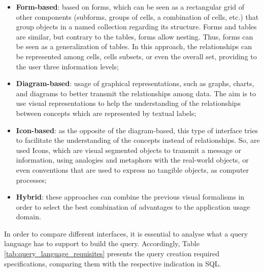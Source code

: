 \begin{itemize}
    \item \textbf{Form-based}: based on forms, which can be seen as a rectangular grid of other components (subforms, groups of cells, a combination of cells, etc.) that group objects in a named collection regarding its structure. Forms and tables are similar,  but contrary to the tables, forms allow nesting. Thus, forms can be seen as a generalization of tables. In this approach, the relationships can be represented among cells, cells subsets, or even the overall set, providing to the user three information levels; %
    \item \textbf{Diagram-based}: usage of graphical representations, such as graphs, charts, and diagrams to better transmit the relationships among data. The aim is to use visual representations to help the understanding of the relationships between concepts which are represented by textual labels;
    \item \textbf{Icon-based}: as the opposite of the diagram-based, this type of interface tries to facilitate the understanding of the concepts instead of relationships. So, are used Icons, which are visual segmented objects to transmit a message or information, using analogies and metaphors with the real-world objects, or even conventions that are used to express no tangible objects, as computer processes;
    \item \textbf{Hybrid}: these approaches can combine the previous visual formalisms in order to select the best combination of advantages to the application usage domain.
\end{itemize}

In order to compare different interfaces, it is essential to analyse what a query language has to support to build the query. Accordingly, Table \ref{tab:query_language_requisites} presents the query creation required specifications, comparing them with the respective indication in SQL.

